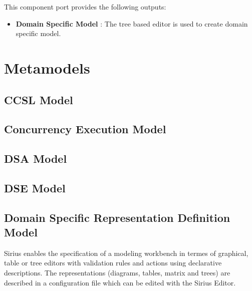 \documentclass{gemoc} %
\begin{document}
This component port provides the following outputs:
\begin{itemize}
  \item \textbf{Domain Specific Model} :
The tree based editor is used to create domain specific model.
\end{itemize}

\section{Metamodels}
\subsection{CCSL Model}


\subsection{Concurrency Execution Model}


\subsection{DSA Model}


\subsection{DSE Model}


\subsection{Domain Specific  Representation Definition Model}
Sirius enables the specification of a modeling workbench in termes of graphical, table or tree editors with validation rules and actions using declarative descriptions. The representations (diagrams, tables, matrix and trees) are described in a configuration file which can be edited with the Sirius Editor.
\end{document}
